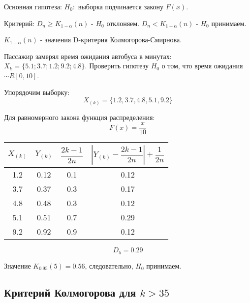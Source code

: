 Основная гипотеза: $H_0:$ выборка подчинается закону $F(x)$.

Критерий: $D_n \geqslant K_{1-\alpha} (n)$ - $H_0$ отклоняем.
  $D_n < K_{1-\alpha} (n)$ - $H_0$ принимаем. 

$K_{1-\alpha} (n)$ - значения D-критерия Колмогорова-Смирнова.

\begin{ex}
  Пассажир замерял время ожидания автобуса в минутах: $X_k = \{ 5.1; 3.7; 1.2; 9.2; 4.8 \}$.
  Проверить гипотезу $H_0$ о том, что время ожидания $\sim R[0, 10]$.
 
  \begin{solution}
  Упорядочим выборку:
  \[
    X_{(k)} = \{ 1.2, 3.7, 4.8, 5.1, 9.2 \}
  \]

  Для равномерного закона функция распределения:
  \[
    F(x) = \dfrac{x}{10}
  \]

  \begin{center}
    \begin{tabular}{|c|c|c|c|}
      \hline
      $X_{(k)}$ & $Y_{(k)}$ & $\dfrac{2k-1}{2n}$ & \vphantom{\Biggl|}$\left| Y_{(k)} - \dfrac{2k-1}{2n} \right| + \dfrac{1}{2n}$ \\
      \hline
      1.2 & 0.12 & 0.1 & 0.12 \\
      3.7 & 0.37 & 0.3 & 0.17 \\
      4.8 & 0.48 & 0.3 & 0.12 \\
      5.1 & 0.51 & 0.7 & 0.29 \\
      9.2 & 0.92 & 0.9 & 0.12 \\
      \hline
    \end{tabular}
  \end{center}

  \[
    D_5 = 0.29
  \]

  Значение $K_{0.95} (5) = 0.56$, следовательно, $H_0$ принимаем.
\end{solution}
\end{ex}

\subsection{Критерий Колмогорова для $k>35$}

